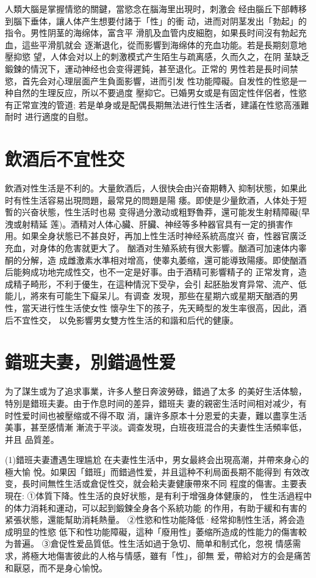 \documentclass[12pt,UTF8]{ctexbook}
\begin{document}
人類大腦是掌握情慾的關鍵，當慾念在腦海里出現时，刺激会
经由腦丘下部轉移到腦下垂体，讓人体产生想要付諸于「性」的衝
动，进而对阴茎发出「勃起」的指令。男性阴茎的海绵体，富含平
滑肌及血管内皮細胞，如果長时间沒有勃起充血，這些平滑肌就会
逐漸退化，從而影響到海绵体的充血功能。若是長期刻意地壓抑慾
望，人体会对以上的刺激模式产生陌生与疏离感，久而久之，在阴
茎缺乏鍛鍊的情況下，運动神经也会变得遲鈍，甚至退化。正常的
男性若是長时间禁慾，首先会对心理层面产生負面影響，进而引发
性功能障礙。自发性的性慾是一种自然的生理反应，所以不要過度
壓抑它。已婚男女或是有固定性伴侶者，性慾有正常宣洩的管道;
若是单身或是配偶長期無法进行性生活者，建議在性慾高漲難耐时
进行適度的自慰。

\section{飲酒后不宜性交}

飲酒对性生活是不利的。大量飲酒后，人很快会由兴奋期轉入
抑制状態，如果此时有性生活容易出現問題，最常見的問題是陽
痿。即使是少量飲酒，人体处于短暫的兴奋状態，性生活时也易
变得過分激动或粗野魯莽，還可能发生射精障礙(早洩或射精延
莲)。酒精对人体心臟、肝臟、神经等多种器官具有一定的損害作
用。如果全身状態已不甚良好，再加上性生活时神经系統高度兴
奋，性器官廣泛充血，对身体的危害就更大了。
酗酒对生殖系統有很大影響。酗酒可加速体内睾酮的分解，造
成雌激素水準相对增高，使睾丸萎缩，還可能導致陽痿。即使酗酒
后能夠成功地完成性交，也不一定是好事。由于酒精可影響精子的
正常发育，造成精子畸形，不利于優生，在這种情況下受孕，会引
起胚胎发育异常、流产、低能儿，將來有可能生下癡呆儿。有调查
发現，那些在星期六或星期天酗酒的男性，當天进行性生活使女性
懷孕生下的孩子，先天畸型的发生率很高，因此，酒后不宜性交，
以免影響男女雙方性生活的和諧和后代的健康。

\section{錯班夫妻，別錯過性爱}

为了謀生或为了追求事業，许多人整日奔波勞碌，錯過了太多
的美好生活体驗，特別是錯班夫妻。由于作息时间的差异，錯班夫
妻的親密生活时间相对减少，有时性爱时间也被壓缩或不得不取
消，讓许多原本十分恩爱的夫妻，難以盡享生活美事，甚至感情漸
漸流于平淡。调查发現，白班夜班混合的夫妻性生活頻率低，并且
品質差。

(1)錯班夫妻遭遇生理尴尬
在夫妻性生活中，男女最終会出現高潮，并帶來身心的極大愉
悅。如果因「錯班」而錯過性爱，并且這种不利局面長期不能得到
有效改变，長时间無性生活或倉促性交，就会耠夫妻健康帶來不同
程度的傷害。主要表現在:
①体質下降。性生活的良好状態，是有利于增强身体健康的，
性生活過程中的体力消耗和運动，可以起到鍛鍊全身各个系統功能
的作用，有助于緩和有害的紧張状態，還能幫助消耗熱量。
②性慾和性功能降低·经常抑制性生活，將会造成明显的性慾
低下和性功能障礙，這种「廢用性」萎缩所造成的性能力的傷害較
为普遍。
③倉促性爱品質低。性生活如過于急切、簡单和制式化，忽視
情感需求，將極大地傷害彼此的人格与情感，雖有「性」，卻無
爱，帶給对方的会是痛苦和厭惡，而不是身心愉悅。
\end{document}
